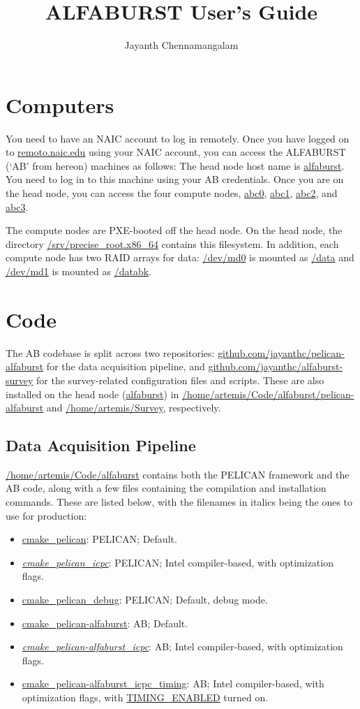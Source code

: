 \documentclass{article}
\title{ALFABURST User's Guide}
\author{Jayanth Chennamangalam}
\begin{document}
\maketitle

\tableofcontents

\section{Computers}

You need to have an NAIC account to log in remotely. Once you have logged on to
\url{remoto.naic.edu} using your NAIC account, you can access the ALFABURST
(`AB' from hereon) machines as follows: The head node host name is
\url{alfaburst}. You need to log in to this machine using your AB credentials.
Once you are on the head node, you can access the four compute nodes,
\url{abc0}, \url{abc1}, \url{abc2}, and \url{abc3}.

The compute nodes are PXE-booted off the head node. On the head node, the
directory \url{/srv/precise_root.x86_64} contains this filesystem. In addition,
each compute node has two RAID arrays for data: \url{/dev/md0} is mounted as
\url{/data} and \url{/dev/md1} is mounted as \url{/databk}.


\section{Code}

The AB codebase is split across two repositories:
\url{github.com/jayanthc/pelican-alfaburst} for the data acquisition pipeline,
and \url{github.com/jayanthc/alfaburst-survey} for the survey-related
configuration files and scripts. These are also installed on the head node
(\url{alfaburst}) in \url{/home/artemis/Code/alfaburst/pelican-alfaburst} and
\url{/home/artemis/Survey}, respectively.

\subsection{Data Acquisition Pipeline}

\url{/home/artemis/Code/alfaburst} contains both the PELICAN framework and the AB
code, along with a few files containing the compilation and installation
commands. These are listed below, with the filenames in italics being the ones
to use for production:

\begin{itemize}
\item \url{cmake_pelican}: PELICAN; Default.
\item \emph{\url{cmake_pelican_icpc}}: PELICAN; Intel compiler-based, with
optimization flags.
\item \url{cmake_pelican_debug}: PELICAN; Default, debug mode.
\item \url{cmake_pelican-alfaburst}: AB; Default.
\item \emph{\url{cmake_pelican-alfaburst_icpc}}: AB; Intel compiler-based,
with optimization flags.
\item \url{cmake_pelican-alfaburst_icpc_timing}: AB; Intel compiler-based, with
optimization flags, with \url{TIMING_ENABLED} turned on.
\end{itemize}
\end{document}
